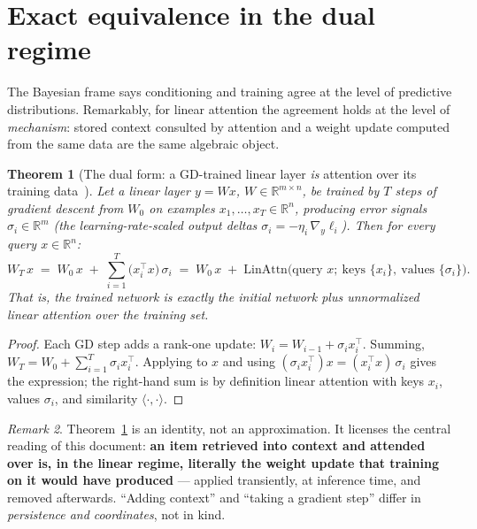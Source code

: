 \documentclass[11pt]{article}
\theoremstyle{plain}
\newtheorem{theorem}{Theorem}[section]
\theoremstyle{definition}
\theoremstyle{remark}
\newtheorem{remark}[theorem]{Remark}
\newcommand{\R}{\mathbb{R}}
\begin{document}
\section{Exact equivalence in the dual regime}\label{sec:dual}

The Bayesian frame says conditioning and training agree at the level of
predictive distributions. Remarkably, for linear attention the agreement
holds at the level of \emph{mechanism}: stored context consulted by
attention and a weight update computed from the same data are the same
algebraic object.

\begin{theorem}[The dual form: a GD-trained linear layer \emph{is} attention
over its training data~\cite{irie}]\label{thm:dualform}
Let a linear layer $y = W x$, $W \in \R^{m \times n}$, be trained by $T$
steps of gradient descent from $W_0$ on examples $x_1, \dots, x_T \in \R^n$,
producing error signals $\sigma_i \in \R^m$ (the learning-rate-scaled output
deltas $\sigma_i = -\eta_i\, \nabla_{y} \ell_i$). Then for every query
$x \in \R^n$:
\[
  W_T\, x
  \;=\; W_0\, x \;+\; \sum_{i=1}^{T} \bigl( x_i^{\top} x \bigr)\, \sigma_i
  \;=\; W_0\, x \;+\;
  \mathrm{LinAttn}\bigl( \text{query } x;\ \text{keys } \{x_i\},\
  \text{values } \{\sigma_i\} \bigr).
\]
That is, the trained network is \emph{exactly} the initial network plus
unnormalized linear attention over the training set.
\end{theorem}

\begin{proof}
Each GD step adds a rank-one update: $W_{i} = W_{i-1} + \sigma_i x_i^{\top}$.
Summing, $W_T = W_0 + \sum_{i=1}^T \sigma_i x_i^{\top}$. Applying to $x$ and
using $(\sigma_i x_i^{\top}) x = (x_i^{\top} x)\, \sigma_i$ gives the
expression; the right-hand sum is by definition linear attention with keys
$x_i$, values $\sigma_i$, and similarity $\langle \cdot, \cdot \rangle$.
\end{proof}

\begin{remark}
Theorem~\ref{thm:dualform} is an identity, not an approximation. It licenses
the central reading of this document: \textbf{an item retrieved into context
and attended over is, in the linear regime, literally the weight update that
training on it would have produced} --- applied transiently, at inference
time, and removed afterwards. ``Adding context'' and ``taking a gradient
step'' differ in \emph{persistence and coordinates}, not in kind.
\end{remark}
\end{document}
